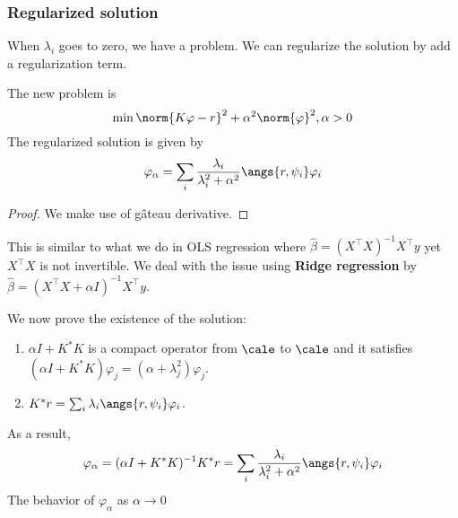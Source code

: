 \subsubsection{Regularized solution}
When $\lambda_i$ goes to zero, we have a problem. We can regularize the
solution by add a regularization term.
\begin{definition}
    The new problem is \begin{equation*}
        \min  \norm{K\varphi-r}^2+\alpha^2\norm{\varphi}^2, \alpha>0
    \end{equation*}
    The regularized solution is given by \begin{equation*}
        \varphi_\alpha=\sum_i \frac{\lambda_i}{\lambda_i^2+\alpha^2}\angs{r,\psi_i}\varphi_i
    \end{equation*}
\end{definition}
\begin{proof}
    We make use of gâteau derivative.
\end{proof}
\begin{remark}
    This is similar to what we do in OLS regression where $\hat{\beta}= (X^\top X)^{-1}X^\top y$ yet $X^\top X$ is not invertible. We deal with the issue using \textbf{Ridge regression} by $\hat{\beta}=(X^\top X+\alpha I)^{-1}X^\top y$.
\end{remark}
We now prove the existence of the solution:
\begin{enumerate}
    \item $\alpha I+K^*K$ is a compact operator from $\cale$ to $\cale$ and it satisfies $(\alpha I+K^*K)\varphi_j=(\alpha+\lambda_j^2)\varphi_j$.
    \item $K^*r=\sum_i \lambda_i\angs{r,\psi_i}\varphi_i$.
\end{enumerate}
As a result, \begin{equation}\label{eq:varphi_alpha}
    \varphi_\alpha=(\alpha I+K^*K)^{-1}K^*r=\sum_i \frac{\lambda_i}{\lambda_i^2+\alpha^2}\angs{r,\psi_i}\varphi_i
\end{equation}
The behavior of $\varphi_\alpha$ as $\alpha\to 0$
